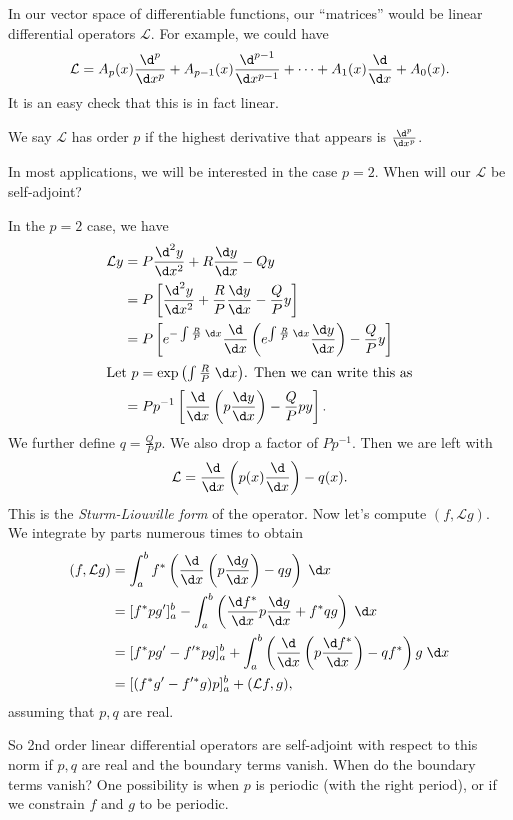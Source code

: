 \documentclass[a4paper]{article}
\begin{document}
In our vector space of differentiable functions, our ``matrices'' would be linear differential operators $\mathcal{L}$. For example, we could have
\[
  \mathcal{L} = A_p(x) \frac{\d^p}{\d x^p} + A_{p - 1}(x) \frac{\d^{p - 1}}{\d x^{p - 1}} + \cdots + A_1(x)\frac{\d}{\d x} + A_0(x).
\]
It is an easy check that this is in fact linear.

We say $\mathcal{L}$ has order $p$ if the highest derivative that appears is $\frac{\d^p}{\d x^p}$.

In most applications, we will be interested in the case $p = 2$. When will our $\mathcal{L}$ be self-adjoint?

In the $p = 2$ case, we have
\begin{align*}
  \mathcal{L} y &= P \frac{\d^2 y}{\d x^2} + R \frac{\d y}{\d x} - Q y \\
  &= P\left[\frac{\d^2 y}{\d x^2} + \frac{R}{P}\frac{\d y}{\d x} - \frac{Q}{P}y\right] \\
  &= P\left[e^{-\int \frac{R}{P}\;\d x}\frac{\d}{\d x}\left(e^{\int \frac{R}{P}\;\d x}\frac{\d y}{\d x}\right)- \frac{Q}{P}y\right]\\
  \intertext{Let $p = \exp\left(\int \frac{R}{P}\;\d x\right)$. Then we can write this as}
  &= P p^{-1}\left[\frac{\d}{\d x}\left(p\frac{\d y}{\d x}\right) - \frac{Q}{P}p y\right].
\end{align*}
We further define $q = \frac{Q}{P}p$. We also drop a factor of $Pp^{-1}$. Then we are left with
\[
  \mathcal{L} = \frac{\d}{\d x}\left(p(x)\frac{\d}{\d x}\right) - q(x).
\]
This is the \emph{Sturm-Liouville form} of the operator. Now let's compute $(f, \mathcal{L}g)$. We integrate by parts numerous times to obtain
\begin{align*}
  (f, \mathcal{L}g) &= \int_a^b f^*\left(\frac{\d}{\d x}\left(p \frac{\d g}{\d x}\right) - qg\right)\;\d x \\
  &= [f^* pg']_a^b - \int_a^b \left(\frac{\d f^*}{\d x}p\frac{\d g}{\d x} + f^* qg\right)\;\d x\\
  &= [f^*pg' - f'^*pg]_a^b + \int_a^b \left(\frac{\d}{\d x}\left(p\frac{\d f^*}{\d x}\right) - qf^*\right)g\;\d x\\
  &= [(f^*g' - f'^*g)p]_a^b + (\mathcal{L}f, g),
\end{align*}
assuming that $p, q$ are real.

So 2nd order linear differential operators are self-adjoint with respect to this norm if $p, q$ are real and the boundary terms vanish. When do the boundary terms vanish? One possibility is when $p$ is periodic (with the right period), or if we constrain $f$ and $g$ to be periodic.
\end{document}
